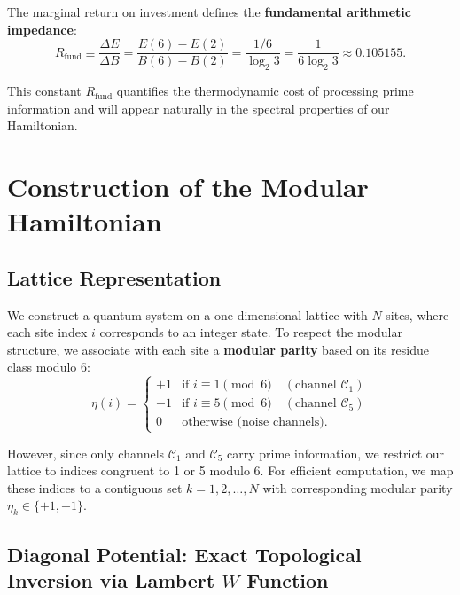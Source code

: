 \documentclass[prl,aps,floatfix,superscriptaddress,10pt]{revtex4-2}
\newcommand{\Rfund}{R_{\text{fund}}}
\begin{document}
The marginal return on investment defines the \textbf{fundamental arithmetic impedance}:
\begin{equation}
\Rfund \equiv \frac{\Delta E}{\Delta B} = \frac{E(6)-E(2)}{B(6)-B(2)} = \frac{1/6}{\log_2 3} = \frac{1}{6\log_2 3} \approx 0.105155.
\end{equation}

This constant $\Rfund$ quantifies the thermodynamic cost of processing prime information and will appear naturally in the spectral properties of our Hamiltonian.

\section{Construction of the Modular Hamiltonian}

\subsection{Lattice Representation}

We construct a quantum system on a one-dimensional lattice with $N$ sites, where each site index $i$ corresponds to an integer state.
To respect the modular structure, we associate with each site a \textbf{modular parity} based on its residue class modulo 6:
\begin{equation}
\eta(i) = \begin{cases}
+1 & \text{if } i \equiv 1 \pmod 6 \quad (\text{channel } \mathcal{C}_1)\\
-1 & \text{if } i \equiv 5 \pmod 6 \quad (\text{channel } \mathcal{C}_5)\\
0 & \text{otherwise (noise channels)}.
\end{cases}
\end{equation}

However, since only channels $\mathcal{C}_1$ and $\mathcal{C}_5$ carry prime information, we restrict our lattice to indices congruent to 1 or 5 modulo 6. For efficient computation, we map these indices to a contiguous set $k = 1,2,\dots,N$ with corresponding modular parity $\eta_k \in \{+1,-1\}$.

\subsection{Diagonal Potential: Exact Topological Inversion via Lambert $W$ Function}
\end{document}
